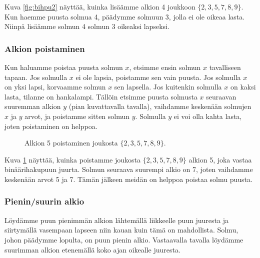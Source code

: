 Kuva \ref{fig:bihpu2} näyttää, kuinka lisäämme alkion 4
joukkoon $\{2,3,5,7,8,9\}$.
Kun haemme puusta solmua 4, päädymme solmuun 3,
jolla ei ole oikeaa lasta.
Niinpä lisäämme solmun 4 solmun 3 oikeaksi lapseksi.

\subsubsection{Alkion poistaminen}

Kun haluamme poistaa puusta solmun $x$, etsimme ensin
solmun $x$ tavalliseen tapaan.
Jos solmulla $x$ ei ole lapsia, poistamme sen vain puusta.
Jos solmulla $x$ on yksi lapsi, korvaamme solmun $x$
sen lapsella.
Jos kuitenkin solmulla $x$ on kaksi lasta,
tilanne on hankalampi.
Tällöin etsimme puusta solmusta $x$ seuraavan
suuremman alkion $y$ (pian kuvattavalla tavalla), vaihdamme keskenään
solmujen $x$ ja $y$ arvot,
ja poistamme sitten solmun $y$.
Solmulla $y$ ei voi olla kahta lasta, joten poistaminen on helppoa.

\begin{figure}
\center
{}
\caption{Alkion 5 poistaminen joukosta $\{2,3,5,7,8,9\}$.}
\label{fig:bihpu3}
\end{figure}

Kuva \ref{fig:bihpu3} näyttää, kuinka poistamme joukosta $\{2,3,5,7,8,9\}$
alkion 5, joka vastaa binäärihakupuun juurta.
Solmun seuraava suurempi alkio on 7,
joten vaihdamme keskenään arvot 5 ja 7.
Tämän jälkeen meidän on helppoa poistaa solmu puusta.

\subsubsection{Pienin/suurin alkio}

Löydämme puun pienimmän alkion lähtemällä liikkeelle
puun juuresta ja siirtymällä vasempaan lapseen niin
kauan kuin tämä on mahdollista.
Solmu, johon päädymme lopulta, on puun pienin alkio.
Vastaavalla tavalla löydämme suurimman alkion
etenemällä koko ajan oikealle juuresta.

